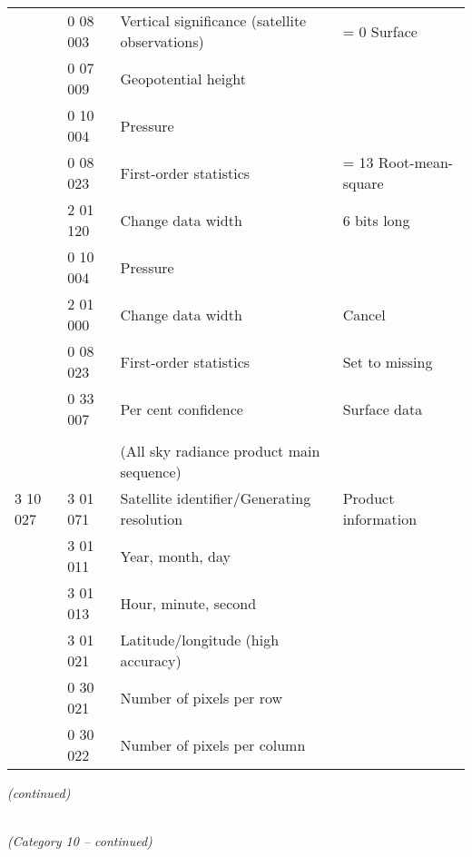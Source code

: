\begin{longtable}[]{@{}llll@{}}
& 0 08 003 & Vertical significance (satellite observations) & = 0 Surface\tabularnewline
& 0 07 009 & Geopotential height &\tabularnewline
& 0 10 004 & Pressure &\tabularnewline
& 0 08 023 & First-order statistics & = 13 Root-mean-square\tabularnewline
& 2 01 120 & Change data width & 6 bits long\tabularnewline
& 0 10 004 & Pressure &\tabularnewline
& 2 01 000 & Change data width & Cancel\tabularnewline
& 0 08 023 & First-order statistics & Set to missing\tabularnewline
& 0 33 007 & Per cent confidence & Surface data\tabularnewline
& & &\tabularnewline
& & (All sky radiance product main sequence) &\tabularnewline
3 10 027 & 3 01 071 & Satellite identifier/Generating resolution & Product information\tabularnewline
& 3 01 011 & Year, month, day &\tabularnewline
& 3 01 013 & Hour, minute, second &\tabularnewline
& 3 01 021 & Latitude/longitude (high accuracy) &\tabularnewline
& 0 30 021 & Number of pixels per row &\tabularnewline
& 0 30 022 & Number of pixels per column &\tabularnewline
\bottomrule
\end{longtable}

\emph{(continued)}

\emph{\\
(Category 10 -- continued)}

